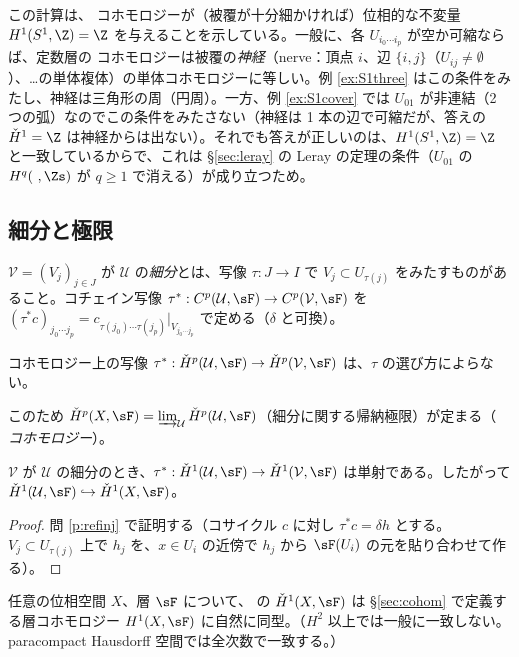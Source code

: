 \begin{rem}
この計算は、\Cech{} コホモロジーが（被覆が十分細かければ）位相的な不変量 $H^1(S^1,\Z)=\Z$ を与えることを示している。一般に、各 $U_{i_0\cdots i_p}$ が空か可縮ならば、定数層の \Cech{} コホモロジーは被覆の\emph{神経}（nerve：頂点 $i$、辺 $\{i,j\}$（$U_{ij}\ne\emptyset$）、…の単体複体）の単体コホモロジーに等しい。例 \ref{ex:S1three} はこの条件をみたし、神経は三角形の周（円周）。一方、例 \ref{ex:S1cover} では $U_{01}$ が非連結（2 つの弧）なのでこの条件をみたさない（神経は 1 本の辺で可縮だが、答えの $\check H^1=\Z$ は神経からは出ない）。それでも答えが正しいのは、$H^1(S^1,\Z)=\Z$ と一致しているからで、これは §\ref{sec:leray} の Leray の定理の条件（$U_{01}$ の $H^q(\ ,\Zs)$ が $q\ge1$ で消える）が成り立つため。
\end{rem}

\subsection{細分と極限}
\begin{defn}
$\mathcal V=(V_j)_{j\in J}$ が $\mathcal U$ の\emph{細分}とは、写像 $\tau:J\to I$ で $V_j\subset U_{\tau(j)}$ をみたすものがあること。コチェイン写像 $\tau^*:C^p(\mathcal U,\sF)\to C^p(\mathcal V,\sF)$ を $(\tau^*c)_{j_0\cdots j_p}=c_{\tau(j_0)\cdots\tau(j_p)}|_{V_{j_0\cdots j_p}}$ で定める（$\delta$ と可換）。
\end{defn}
\begin{prop}\tC
コホモロジー上の写像 $\tau^*:\check H^p(\mathcal U,\sF)\to\check H^p(\mathcal V,\sF)$ は、$\tau$ の選び方によらない。
\end{prop}
このため $\check H^p(X,\sF)=\varinjlim_{\mathcal U}\check H^p(\mathcal U,\sF)$（細分に関する帰納極限）が定まる（\emph{\Cech{} コホモロジー}）。
\begin{prop}\label{prop:H1inj}\tP
$\mathcal V$ が $\mathcal U$ の細分のとき、$\tau^*:\check H^1(\mathcal U,\sF)\to\check H^1(\mathcal V,\sF)$ は単射である。したがって $\check H^1(\mathcal U,\sF)\hookrightarrow\check H^1(X,\sF)$。
\end{prop}
\begin{proof}
問 \ref{p:refinj} で証明する（コサイクル $c$ に対し $\tau^*c=\delta h$ とする。$V_j\subset U_{\tau(j)}$ 上で $h_j$ を、$x\in U_i$ の近傍で $h_j$ から $\sF(U_i)$ の元を貼り合わせて作る）。\qedhere
\end{proof}
\begin{thm}\tC
任意の位相空間 $X$、層 $\sF$ について、\Cech{} の $\check H^1(X,\sF)$ は \S\ref{sec:cohom} で定義する層コホモロジー $H^1(X,\sF)$ に自然に同型。（$H^2$ 以上では一般に一致しない。paracompact Hausdorff 空間では全次数で一致する。）
\end{thm}

